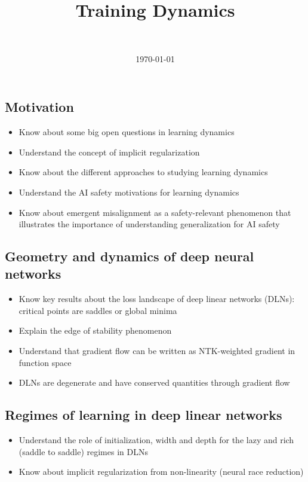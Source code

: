 \documentclass[11pt]{article}
\title{Training Dynamics}
\author{\authorname{Guillaume Corlouer}\\ \affiliation{Stormglass}}
\date{\today}
\begin{document}
\maketitle

\begin{learningoutcomes}
  \subsection*{Motivation}
  \begin{itemize}
    \item Know about some big open questions in learning dynamics
    \item Understand the concept of implicit regularization
    \item Know about the different approaches to studying learning dynamics
    \item Understand the AI safety motivations for learning dynamics
    \item Know about emergent misalignment as a safety-relevant phenomenon that illustrates the importance of understanding generalization for AI safety
  \end{itemize}

  \subsection*{Geometry and dynamics of deep neural networks}
  \begin{itemize}
    \item Know key results about the loss landscape of deep linear networks (DLNs): critical points are saddles or global minima
    \item Explain the edge of stability phenomenon
    \item Understand that gradient flow can be written as NTK-weighted gradient in function space
    \item DLNs are degenerate and have conserved quantities through gradient flow
  \end{itemize}

  \subsection*{Regimes of learning in deep linear networks}
  \begin{itemize}
    \item Understand the role of initialization, width and depth for the lazy and rich (saddle to saddle) regimes in DLNs
    \item Know about implicit regularization from non-linearity (neural race reduction)
  \end{itemize}
\end{learningoutcomes}
\end{document}
